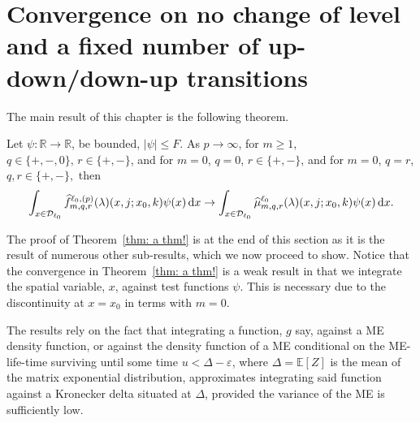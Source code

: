 \section{Convergence on no change of level and a fixed number of up-down/down-up transitions}\label{sec: no change convergence}
The main result of this chapter is the following theorem.
\begin{thm}\label{thm: a thm!}
	Let \(\psi:\mathbb R\to\mathbb R\), be bounded, \(|\psi|\leq F\). As \(p\to \infty\), for \(m\geq 1\), \(q\in\{+,-,0\},\, r\in\{+,-\}\), and for \(m=0\), \(q=0\), \(r\in\{+,-\}\), and for \(m=0\), \(q=r\), \(q,r\in\{+,-\},\) then
	\begin{align}\int_{x\in\mathcal{D}_{\ell_0}}\widehat f_{m,q,r}^{\ell_0,(p)}(\lambda)(x,j;x_0,k)\psi(x)\, \mathrm{d} x \to \int_{x\in\mathcal{D}_{\ell_0}}\widehat \mu_{m,q,r}^{\ell_0}(\lambda)(x,j;x_0,k)\psi(x)\, \mathrm{d} x.\label{eqn: thm 2}\end{align}
\end{thm}
The proof of Theorem~\ref{thm: a thm!} is at the end of this section as it is the result of numerous other sub-results, which we now proceed to show. Notice that the convergence in Theorem~\ref{thm: a thm!} is a weak result in that we integrate the spatial variable, \(x\), against test functions \(\psi\). This is necessary due to the discontinuity at \(x=x_0\) in terms with \(m=0\).

The results rely on the fact that integrating a function, \(g\) say, against a ME density function, or against the density function of a ME conditional on the ME-life-time surviving until some time \(u<\Delta-\varepsilon\), where \(\Delta = \mathbb E[Z]\) is the mean of the matrix exponential distribution, approximates integrating said function against a Kronecker delta situated at \(\Delta\), provided the variance of the ME is sufficiently low. 

